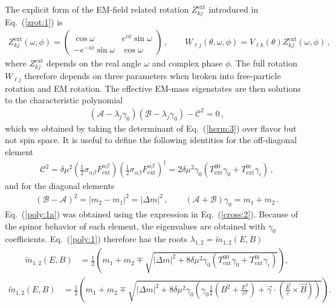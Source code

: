\documentclass[addchapnum]{ws-rv961x669} %
\newcommand{\req}[1]{Eq.~(\ref{#1})}
\begin{document}
The explicit form of the EM-field related rotation $Z_{kj}^\mathrm{ext}$ introduced in \req{zrot:1} is
\begin{align}
\label{zrot:2}
Z_{kj}^\mathrm{ext}(\omega,\phi)=
\begin{pmatrix}
\cos\omega & e^{i\phi}\sin\omega\\
-e^{-i\phi}\sin\omega & \cos\omega
\end{pmatrix}\,,\qquad
W_{\ell j}(\theta,\omega,\phi)=V_{\ell k}(\theta)Z_{kj}^\mathrm{ext}(\omega,\phi)\,,
\end{align}
where $Z_{kj}^\mathrm{ext}$ depends on the real angle $\omega$ and complex phase $\phi$. The full rotation $W_{\ell j}$ therefore depends on three parameters when broken into free-particle rotation and EM rotation. The effective EM-mass eigenstates are then solutions to the characteristic polynomial
\begin{align}
\label{poly:1}
(\mathcal{A}-\lambda_{j}\gamma_{0})(\mathcal{B}-\lambda_{j}\gamma_{0})-\mathcal{C}^{2}=0\,,
\end{align}
which we obtained by taking the determinant of \req{herm:3} over flavor but not spin space. It is useful to define the following identities for the off-diagonal element
\begin{align}
\label{poly:1a}
\mathcal{C}^{2} = 
\delta\mu^{2}\left(\frac{1}{2}\sigma_{\alpha\beta}F^{\alpha\beta}_\mathrm{ext}\right)\left(\frac{1}{2}\sigma_{\alpha\beta}F^{\alpha\beta}_\mathrm{ext}\right)^{\dag}=
2\delta\mu^{2}\gamma_{0}\left(T_\mathrm{ext}^{00}\gamma_{0}+T_\mathrm{ext}^{0i}\gamma_{i}\right)\,,
\end{align}
and for the diagonal elements
\begin{align}
(\mathcal{B}-\mathcal{A})^{2} = |m_{2}-m_{1}|^{2} = |\Delta m|^{2}\,,\qquad (\mathcal{A}+\mathcal{B})\gamma_{0} = m_{1} + m_{2}\,.
\end{align}
\req{poly:1a} was obtained using the expression in \req{cross:2}. Because of the spinor behavior of each element, the eigenvalues are obtained with $\gamma_{0}$ coefficients. \req{poly:1} therefore has the roots $\lambda_{1,2} = \widetilde m_{1,2}(E,B)$
\begin{align}
\label{poly:2}
\widetilde m_{1,2}(E,B)\! &=\! \frac{1}{2}\left(m_{1}\!+\!m_{2}\!\mp\!\sqrt{|\Delta m|^{2}\!+\!8\delta\mu^{2}\gamma_{0}\left(T_\mathrm{ext}^{00}\gamma_{0}+T_\mathrm{ext}^{0i}\gamma_{i}\right)}\right)\!,
\end{align}
%
\begin{align}
\label{poly:3}
\widetilde m_{1,2}(E,B)\! &=\! \frac{1}{2}\left(m_{1}\!+\!m_{2}\!\mp\!\sqrt{|\Delta m|^{2}\!+\!8\delta\mu^{2}\gamma_{0}\left(\gamma_{0}\frac{1}{2}\left(B^{2}\!+\!\frac{E^{2}}{c^{2}}\right)\!+\!\vec{\gamma}\!\cdot\!(\frac{\vec{E}}{c}\times\vec{B})\right)}\right)\!.
\end{align}
\end{document}
